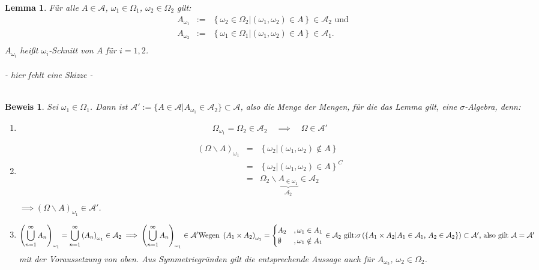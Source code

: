 \documentclass[a4paper,11pt]{book}
\def\AA{ \mathcal{A} }
\def\folgt{\ensuremath{\implies}}
\newtheorem{Lem}{Lemma}[chapter]
\theoremstyle{nonumberplain}
\newtheorem{Bew}{Beweis}
\begin{document}
\begin{Lem} \label{Lem3.1}Für alle $A\in\AA$, $\omega_1\in\Omega_1$, $\omega_2\in\Omega_2$ gilt: \\
\begin{eqnarray*}
A_{\omega_1} &:=& \left\{\omega_2\in\Omega_2|\left(\omega_1,\omega_2\right)\in A\right\}\in\AA_2 \text{ und} \\
A_{\omega_2} &:=& \left\{\omega_1\in\Omega_1|\left(\omega_1,\omega_2\right)\in A\right\}\in\AA_1 \text{.} \\
\end{eqnarray*}
$A_{\omega_i}$ heißt $\omega_i$-Schnitt von $A$ für $i=1,2$. \\
\quad\\
- hier fehlt eine Skizze - \\ %
\quad\\
\end{Lem}
\begin{Bew} Sei $\omega_1\in\Omega_1$. Dann ist $\AA':=\{A\in\AA|A_{\omega_1}\in\AA_2\}\subset\AA$, also die Menge der Mengen, für die das Lemma gilt, eine $\sigma$-Algebra, denn:
\begin{enumerate}
\item[(i)] \begin{displaymath} \Omega_{\omega_1}=\Omega_2\in\AA_2\quad\folgt\quad\Omega\in\AA' \end{displaymath}
\item[(ii)]\begin{eqnarray*}
\left(\Omega\backslash A\right)_{\omega_1} &=& \left\{\omega_2|\left(\omega_1,\omega_2\right)\notin A\right\} \\
 &=& \left\{\omega_2|\left(\omega_1,\omega_2\right)\in A\right\}^C \\
 &=& \Omega_2\backslash\underbrace{A_{\in\omega_1}}_{\AA_2}\in\AA_2 \\
\end{eqnarray*} $\folgt (\Omega\backslash A)_{\omega_1}\in\AA'$.
\item[(iii)]\begin{displaymath}
\left(\bigcup_{n=1}^{\infty}A_n\right)_{\omega_1} = \bigcup_{n=1}^{\infty}\left( A_n\right)_{\omega_1}\in\AA_2 \folgt \left(\bigcup_{n=1}^{\infty}A_n\right)_{\omega_1}\in\AA' $$\\$$
\text{Wegen }\left(A_1\times A_2\right)_{\omega_1}= 
\begin{cases}
A_2 & ,\omega_1\in A_1 \\
\emptyset & ,\omega_1\notin A_1 \\
\end{cases}
\in\AA_2 \text{ gilt:}$$\\$$
\sigma\left(\left\{A_1\times A_2|A_1\in\AA_1\text{, }A_2\in\AA_2\right\}\right)\subset\AA'\text{, also gilt }\AA=\AA'
\end{displaymath}
mit der Voraussetzung von oben. Aus Symmetriegründen gilt die entsprechende Aussage auch für $A_{\omega_2}$, $\omega_2\in\Omega_2$.
\end{enumerate}
\end{Bew}
\end{document}
